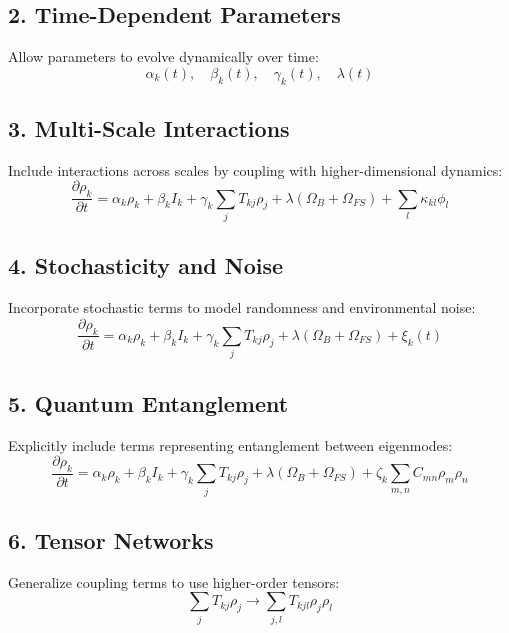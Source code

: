 \documentclass{article}
\theoremstyle{plain}
\begin{document}
\subsection{2. Time-Dependent Parameters}
Allow parameters to evolve dynamically over time:
\begin{equation}
\alpha_k(t), \quad \beta_k(t), \quad \gamma_k(t), \quad \lambda(t)
\end{equation}

\subsection{3. Multi-Scale Interactions}
Include interactions across scales by coupling with higher-dimensional dynamics:
\begin{equation}
\frac{\partial \rho_k}{\partial t} = \alpha_k \rho_k + \beta_k I_k + \gamma_k \sum_j T_{kj} \rho_j + \lambda (\Omega_B + \Omega_{FS}) + \sum_l \kappa_{kl} \phi_l
\end{equation}

\subsection{4. Stochasticity and Noise}
Incorporate stochastic terms to model randomness and environmental noise:
\begin{equation}
\frac{\partial \rho_k}{\partial t} = \alpha_k \rho_k + \beta_k I_k + \gamma_k \sum_j T_{kj} \rho_j + \lambda (\Omega_B + \Omega_{FS}) + \xi_k(t)
\end{equation}

\subsection{5. Quantum Entanglement}
Explicitly include terms representing entanglement between eigenmodes:
\begin{equation}
\frac{\partial \rho_k}{\partial t} = \alpha_k \rho_k + \beta_k I_k + \gamma_k \sum_j T_{kj} \rho_j + \lambda (\Omega_B + \Omega_{FS}) + \zeta_k \sum_{m,n} C_{mn} \rho_m \rho_n
\end{equation}

\subsection{6. Tensor Networks}
Generalize coupling terms to use higher-order tensors:
\begin{equation}
\sum_j T_{kj} \rho_j \to \sum_{j,l} T_{kjl} \rho_j \rho_l
\end{equation}
\end{document}
